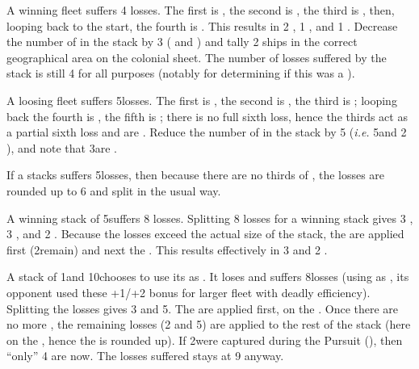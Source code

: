 \begin{exemple}
  A winning fleet suffers 4 losses. The first is , the second
  is , the third is , then, looping back to
  the start, the fourth is . This results in 2 
  \ND, 1 , and 1 . Decrease the number of \ND
  in the stack by 3 ( and ) and tally 2
   ships in the correct geographical area on the colonial
  sheet. The number of losses suffered by the stack is still 4 for all
  purposes (notably for determining if this was a ).

  \smallskip

  A loosing \NWD fleet suffers 5\texttd losses. The first is ,
  the second is , the third is ; looping back
  the fourth is , the fifth is ; there is no
  full sixth loss, hence the thirds act as a partial sixth loss and are
  . Reduce the number of \ND in the stack by 5\texttd
  (\emph{i.e.} 5\ND and 2 \NDE), and note that 3\texttd are .

  \smallskip

  If a \NGD stacks suffers 5\texttu losses, then because there are no
  thirds of \NGD, the losses are rounded up to 6 and split in the usual way.

  \smallskip

  A winning stack of 5\ND suffers 8 losses. Splitting 8 losses for a winning
  stack gives 3 , 3 , and 2
  . Because the losses exceed the actual size of the stack,
  the  are applied first (2\ND remain) and next the
  . This results effectively in 3  and 2
  .

  \smallskip

  A stack of 1\NWD and 10\NGD chooses to use its \NWD as . It loses and suffers 8\texttd losses (using \NGD as , its opponent used these +1/+2 bonus for larger fleet with
  deadly efficiency). Splitting the losses gives 3  and
  5\texttd {}. The  are applied first, on the
  . Once there are no more ,
  the remaining losses (2  and 5\texttd {}) are
  applied to the rest of the stack (here on the \NGD, hence the \texttd is
  rounded up). If 2\NGD were captured during the Pursuit (\textetoile), then
  ``only'' 4 are  now. The losses suffered stays at 9 anyway.
\end{exemple}

